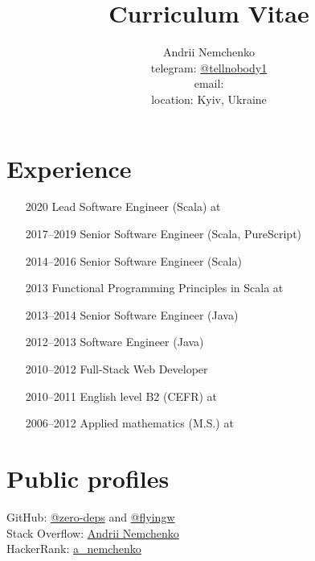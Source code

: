 

\title{Curriculum Vitae}
\author{
  Andrii Nemchenko\\
  telegram: \href{https://t.me/tellnobody1}{@tellnobody1}\\
  email: \\
  location: Kyiv, Ukraine
}
\maketitle

\section{Experience}
\begin{itemize}
  \item[2020] Lead Software Engineer (Scala) at 
  \item[2017–2019] Senior Software Engineer (Scala, PureScript)
  \item[2014–2016] Senior Software Engineer (Scala)
  \item[2013] Functional Programming Principles in Scala at 
  \item[2013–2014] Senior Software Engineer (Java)
  \item[2012–2013] Software Engineer (Java)
  \item[2010–2012] Full-Stack Web Developer
  \item[2010–2011] English level B2 (CEFR) at 
  \item[2006–2012] Applied mathematics (M.S.) at 
\end{itemize}

\section{Public profiles}
GitHub:
\href{https://github.com/zero-deps}{@zero-deps} and
\href{https://github.com/flyingw}{@flyingw} \\
Stack Overflow:
\href{https://stackoverflow.com/users/355491}{Andrii Nemchenko} \\
HackerRank:
\href{https://www.hackerrank.com/a\_nemchenko}{a\_nemchenko}

\pagebreak

